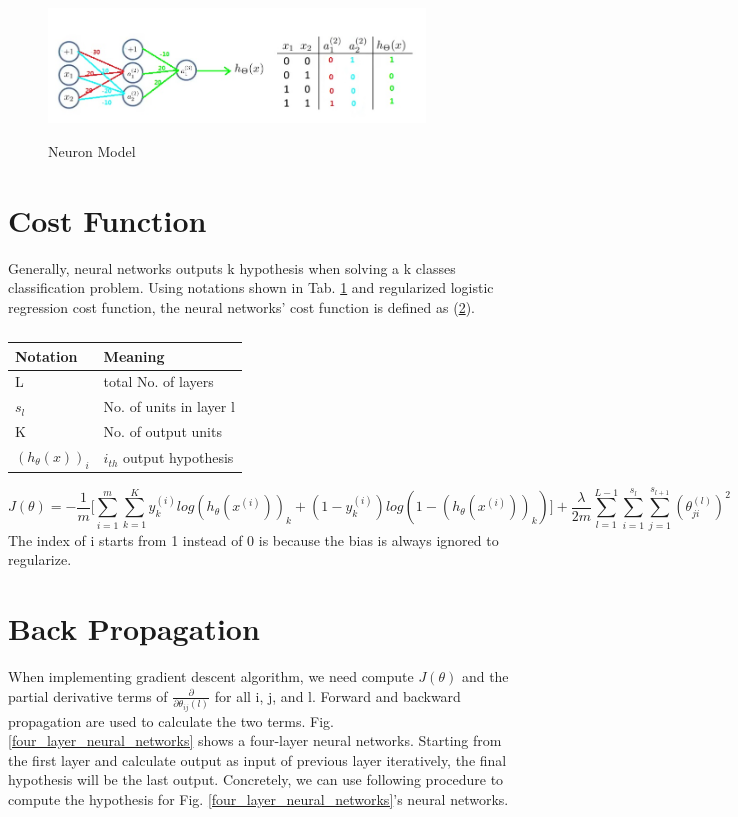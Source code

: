 \documentclass{article}
\begin{document}
\begin{figure}[ht]
  \centering
  \includegraphics[width=10cm]{Figure6.jpg}\\
  \caption{Neuron Model}\label{XOR_neural_networks}
\end{figure}
\section{Cost Function}
Generally, neural networks outputs k hypothesis when solving a k classes classification problem. Using notations shown in Tab. \ref{neural_networks_cost_function_notation} and regularized logistic regression cost function, the neural networks' cost function is defined as (\ref{}).
\begin{table}[hb]
\begin{center}
\caption{}\label{neural_networks_cost_function_notation}
\begin{tabular}{l|l}
\hline
Notation & Meaning\\
\hline
L   & total No. of layers\\
$s_{l}$ & No. of units in layer l\\
K   & No. of output units \\
$(h_{\theta}(x))_{i}$ & $i_{th}$ output hypothesis\\
\hline
\end{tabular}
\end{center}
\end{table}
\begin{equation}\label{neural_networks_cost_function}
J(\theta) = -\frac{1}{m}\biggl[\sum_{i=1}^{m}\sum_{k=1}^{K} y_{k}^{(i)}log(h_{\theta}(x^{(i)}))_{k} + (1 - y_{k}^{(i)})log(1 - (h_{\theta}(x^{(i)}))_{k})\biggr] + \frac{\lambda}{2m}\sum_{l=1}^{L-1}\sum_{i=1}^{s_{l}}\sum_{j=1}^{s_{l+1}}(\theta_{ji}^{(l)})^{2}
\end{equation}
The index of i starts from 1 instead of 0 is because the bias is always ignored to regularize. 

\section{Back Propagation}
When implementing gradient descent algorithm, we need compute $J(\theta)$ and the partial derivative terms of $\frac{\partial}{\partial \theta_{ij}{(l)}}$ for all i, j, and l. Forward and backward propagation are used to calculate the two terms. Fig. \ref{four_layer_neural_networks} shows a four-layer neural networks. Starting from the first layer and calculate output as input of previous layer iteratively, the final hypothesis will be the last output. Concretely, we can use following procedure to compute the hypothesis for Fig. \ref{four_layer_neural_networks}'s neural networks.
\end{document}
